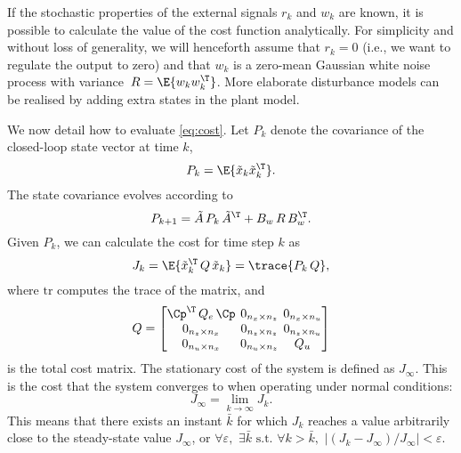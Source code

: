 If the stochastic properties of the external signals $r_k$ and $w_k$ are known, it is possible to calculate the value of the cost function analytically.
For simplicity and without loss of generality, we will henceforth assume that $r_k = 0$ (i.e., we want to regulate the output to zero) and that $w_k$ is a zero-mean Gaussian white noise process with variance~$R=\E{w_k w_k^\T}$.
More elaborate disturbance models can be realised by adding extra states in the plant model.

We now detail how to evaluate \eqref{eq:cost}.
Let $P_k$ denote the covariance of the closed-loop state vector at time $k$,
%
\begin{equation}
\label{eq:covarcalc}
    P_k = \E{\tilde x_k \tilde x_k^\T }.
\end{equation}
%
The state covariance evolves according to
%
\begin{equation}
\label{eq:covevolution}
    P_{k+1} = \tilde A \,P_k\, \tilde A^\T + B_w \,R\, B_w^\T.
\end{equation}
%
Given $P_k$, we can calculate the cost for time step $k$ as
%
\begin{equation}
\label{eq:covartocost}
    J_k = \E{\tilde x_k^\T \,Q\, \tilde x_k } = \trace{P_k \,Q},
\end{equation}
%
where $\mathrm{tr}$ computes the trace of the matrix, and
%
\begin{equation}
    \setlength\arraycolsep{2pt}
    Q = \begin{bmatrix} 
        \Cp^\T\,Q_e\,\Cp                           & 0_{n_x \times n_z} & 0_{n_x \times n_u} \\
        0_{n_z \times n_x}  & 0_{n_z \times n_z}   & 0_{n_z \times n_u} \\
        0_{n_u \times n_x} & 0_{n_u \times n_z}  & Q_u
    \end{bmatrix} 
\end{equation}
%
is the total cost matrix.
The stationary cost of the system is defined as $J_\infty$.
This is the cost that the system converges to when operating under normal conditions:
%
\begin{equation}
    J_\infty = \lim_{k\rightarrow\infty} J_k.
\end{equation}
%
This means that there exists an instant $\bar{k}$ for which $J_k$ reaches a value arbitrarily close to the steady-state value $J_\infty$, or $\forall \varepsilon, \,\, \exists \bar{k} \text{~s.t.~} \forall k>\bar{k},\,\,|(J_k - J_\infty)/J_\infty| < \varepsilon$.
